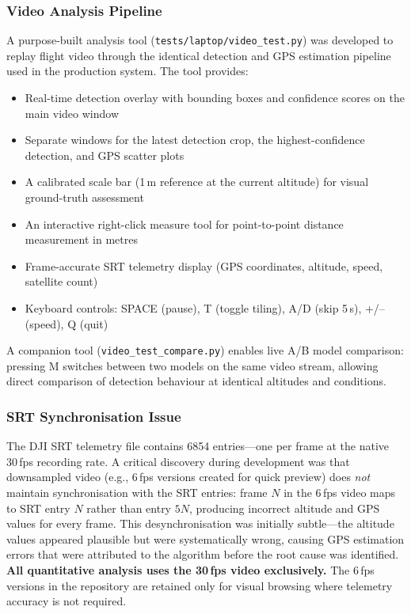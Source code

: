 \documentclass[10pt,a4paper]{article}
\begin{document}
\subsubsection{Video Analysis Pipeline}

A purpose-built analysis tool (\texttt{tests/laptop/video\_test.py}) was developed to replay flight video through the identical detection and GPS estimation pipeline used in the production system. The tool provides:

\begin{itemize}
    \item Real-time detection overlay with bounding boxes and confidence scores on the main video window
    \item Separate windows for the latest detection crop, the highest-confidence detection, and GPS scatter plots
    \item A calibrated scale bar (1\,m reference at the current altitude) for visual ground-truth assessment
    \item An interactive right-click measure tool for point-to-point distance measurement in metres
    \item Frame-accurate SRT telemetry display (GPS coordinates, altitude, speed, satellite count)
    \item Keyboard controls: SPACE (pause), T (toggle tiling), A/D (skip 5\,s), +/-- (speed), Q (quit)
\end{itemize}

A companion tool (\texttt{video\_test\_compare.py}) enables live A/B model comparison: pressing M switches between two models on the same video stream, allowing direct comparison of detection behaviour at identical altitudes and conditions.

\subsubsection{SRT Synchronisation Issue}

The DJI SRT telemetry file contains 6854 entries---one per frame at the native 30\,fps recording rate. A critical discovery during development was that downsampled video (e.g., 6\,fps versions created for quick preview) does \emph{not} maintain synchronisation with the SRT entries: frame $N$ in the 6\,fps video maps to SRT entry $N$ rather than entry $5N$, producing incorrect altitude and GPS values for every frame. This desynchronisation was initially subtle---the altitude values appeared plausible but were systematically wrong, causing GPS estimation errors that were attributed to the algorithm before the root cause was identified. \textbf{All quantitative analysis uses the 30\,fps video exclusively.} The 6\,fps versions in the repository are retained only for visual browsing where telemetry accuracy is not required.
\end{document}
